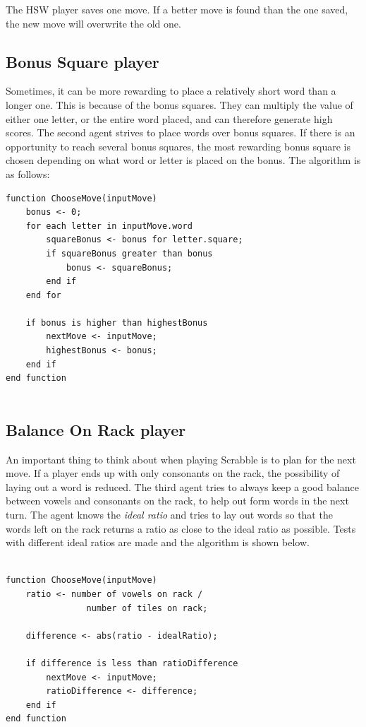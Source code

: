 \documentclass[a4paper, 12pt]{report}
\begin{document}
The HSW player saves one move. If a better move is found than the one saved, the new move will overwrite the old one.

\subsection{Bonus Square player}
Sometimes, it can be more rewarding to place a relatively short word than a longer one. This is because of the bonus squares. They can multiply the value of either one letter, or the entire word placed, and can therefore generate high scores. The second agent strives to place words over bonus squares. If there is an opportunity to reach several bonus squares, the most rewarding bonus square is chosen depending on what word or letter is placed on the bonus. The algorithm is as follows:

\begin{lstlisting}
function ChooseMove(inputMove)
	bonus <- 0;
	for each letter in inputMove.word
		squareBonus <- bonus for letter.square;
		if squareBonus greater than bonus
			bonus <- squareBonus;
		end if 
	end for
	
	if bonus is higher than highestBonus
		nextMove <- inputMove;
		highestBonus <- bonus;
	end if
end function
			
\end{lstlisting}

\subsection{Balance On Rack player}
An important thing to think about when playing Scrabble is to plan for the next move. If a player ends up with only consonants on the rack, the possibility of laying out a word is reduced. The third agent tries to always keep a good balance between vowels and consonants on the rack, to help out form words in the next turn. The agent knows the \emph{ideal ratio} and tries to lay out words so that the words left on the rack returns a ratio as close to the ideal ratio as possible. Tests with different ideal ratios are made and the algorithm is shown below.

\begin{lstlisting}

function ChooseMove(inputMove)
	ratio <- number of vowels on rack / 
				number of tiles on rack;

	difference <- abs(ratio - idealRatio);

	if difference is less than ratioDifference
		nextMove <- inputMove;
		ratioDifference <- difference;
	end if
end function
\end{lstlisting}
\end{document}

